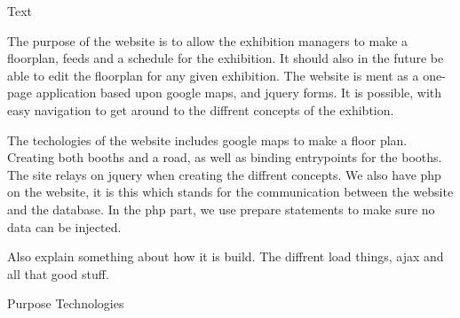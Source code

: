 Text

The purpose of the website is to allow the exhibition managers to make a floorplan, feeds and a schedule for the exhibition.
It should also in the future be able to edit the floorplan for any given exhibition.
The website is ment as a one-page application based upon google maps, and jquery forms.
It is possible, with easy navigation to get around to the diffrent concepts of the exhibtion.

The techologies of the website includes google maps to make a floor plan. Creating both booths and a road, as well as binding entrypoints for the booths. The site relays on jquery when creating the diffrent concepts.
We also have php on the website, it is this which stands for the communication between the website and the database.
In the php part, we use prepare statements to make sure no data can be injected.

Also explain something about how it is build. The diffrent load things, ajax and all that good stuff.



Purpose
Technologies

